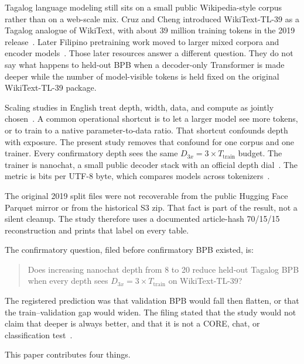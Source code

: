 \documentclass[11pt,a4paper]{article}
\begin{document}
Tagalog language modeling still sits on a small public Wikipedia-style corpus rather than on a web-scale mix. Cruz and Cheng introduced WikiText-TL-39 as a Tagalog analogue of WikiText, with about 39 million training tokens in the 2019 release~\cite{cruz2019eval}. Later Filipino pretraining work moved to larger mixed corpora and encoder models~\cite{cruz2022tlunified}. Those later resources answer a different question. They do not say what happens to held-out BPB when a decoder-only Transformer is made deeper while the number of model-visible tokens is held fixed on the original WikiText-TL-39 package.

Scaling studies in English treat depth, width, data, and compute as jointly chosen~\cite{kaplan2020scaling,hoffmann2022chinchilla,muennighoff2023dataconstrained}. A common operational shortcut is to let a larger model see more tokens, or to train to a native parameter-to-data ratio. That shortcut confounds depth with exposure. The present study removes that confound for one corpus and one trainer. Every confirmatory depth sees the same $D_{3x}=3\times T_{\mathrm{train}}$ budget. The trainer is nanochat, a small public decoder stack with an official depth dial~\cite{karpathy2026nanochat}. The metric is bits per UTF-8 byte, which compares models across tokenizers~\cite{shannon1951prediction,brown2020gpt3,melis2018eval}.

The original 2019 split files were not recoverable from the public Hugging Face Parquet mirror or from the historical S3 zip. That fact is part of the result, not a silent cleanup. The study therefore uses a documented article-hash 70/15/15 reconstruction and prints that label on every table.

The confirmatory question, filed before confirmatory BPB existed, is:

\begin{quote}
Does increasing nanochat depth from 8 to 20 reduce held-out Tagalog BPB when every depth sees $D_{3x}=3\times T_{\mathrm{train}}$ on WikiText-TL-39?
\end{quote}

The registered prediction was that validation BPB would fall then flatten, or that the train--validation gap would widen. The filing stated that the study would not claim that deeper is always better, and that it is not a CORE, chat, or classification test~\cite{aspredicted306780}.

This paper contributes four things.
\end{document}
